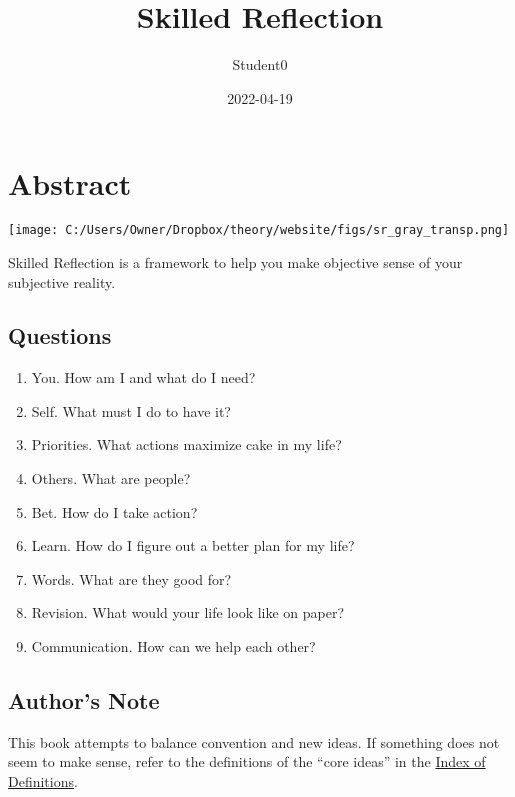 \documentclass[
]{book}
\title{Skilled Reflection}
\author{Student0}
\date{2022-04-19}
\providecommand{\tightlist}{%
  \setlength{\itemsep}{0pt}\setlength{\parskip}{0pt}}
\begin{document}
\maketitle

{
\setcounter{tocdepth}{1}
\tableofcontents
}
\hypertarget{abstract}{%
\chapter*{Abstract}\label{abstract}}

\texttt{[image: C:/Users/Owner/Dropbox/theory/website/figs/sr\_gray\_transp.png]}

Skilled Reflection is a framework to help you make objective sense of your subjective reality.

\hypertarget{questions}{%
\section{Questions}\label{questions}}

\begin{enumerate}
\def\labelenumi{\arabic{enumi}.}
\tightlist
\item
  You. How am I and what do I need?
\item
  Self. What must I do to have it?
\item
  Priorities. What actions maximize cake in my life?\\
\item
  Others. What are people?\\
\item
  Bet. How do I take action?\\
\item
  Learn. How do I figure out a better plan for my life?\\
\item
  Words. What are they good for?\\
\item
  Revision. What would your life look like on paper?
\item
  Communication. How can we help each other?
\end{enumerate}

\hypertarget{authors-note}{%
\section{Author's Note}\label{authors-note}}

This book attempts to balance convention and new ideas. If something does not seem to make sense, refer to the definitions of the ``core ideas'' in the \protect\hyperlink{index-of-definitions}{Index of Definitions}.
\end{document}

